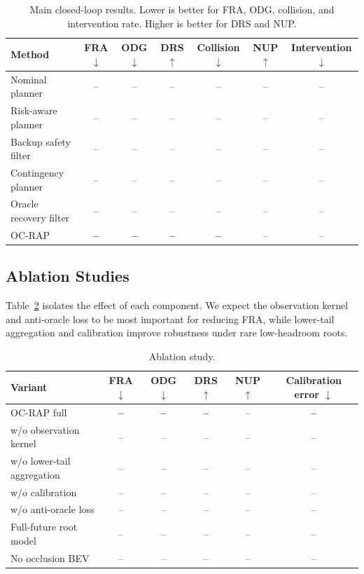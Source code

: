 \documentclass[conference]{IEEEtran}
\begin{document}
\begin{table}[t]
\centering
\caption{Main closed-loop results.  Lower is better for FRA, ODG, collision, and intervention rate.  Higher is better for DRS and NUP.}
\label{tab:main_results}
\begin{tabular}{lcccccc}
\toprule
Method & FRA $\downarrow$ & ODG $\downarrow$ & DRS $\uparrow$ & Collision $\downarrow$ & NUP $\uparrow$ & Intervention $\downarrow$ \\
\midrule
Nominal planner & -- & -- & -- & -- & -- & -- \\
Risk-aware planner & -- & -- & -- & -- & -- & -- \\
Backup safety filter & -- & -- & -- & -- & -- & -- \\
Contingency planner & -- & -- & -- & -- & -- & -- \\
Oracle recovery filter & -- & -- & -- & -- & -- & -- \\
OC-RAP & \textbf{--} & \textbf{--} & \textbf{--} & \textbf{--} & -- & -- \\
\bottomrule
\end{tabular}
\end{table}

\subsection{Ablation Studies}
\label{subsec:ablation}

Table~\ref{tab:ablation} isolates the effect of each component.  We expect the observation kernel and anti-oracle loss to be most important for reducing FRA, while lower-tail aggregation and calibration improve robustness under rare low-headroom roots.

\begin{table}[t]
\centering
\caption{Ablation study.}
\label{tab:ablation}
\begin{tabular}{lccccc}
\toprule
Variant & FRA $\downarrow$ & ODG $\downarrow$ & DRS $\uparrow$ & NUP $\uparrow$ & Calibration error $\downarrow$ \\
\midrule
OC-RAP full & \textbf{--} & \textbf{--} & \textbf{--} & -- & \textbf{--} \\
w/o observation kernel & -- & -- & -- & -- & -- \\
w/o lower-tail aggregation & -- & -- & -- & -- & -- \\
w/o calibration & -- & -- & -- & -- & -- \\
w/o anti-oracle loss & -- & -- & -- & -- & -- \\
Full-future root model & -- & -- & -- & -- & -- \\
No occlusion BEV & -- & -- & -- & -- & -- \\
\bottomrule
\end{tabular}
\end{table}
\end{document}
